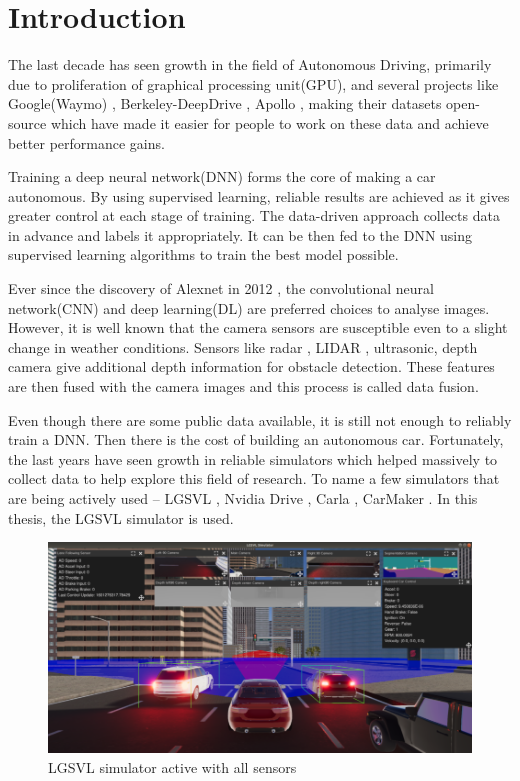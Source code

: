 \chapter{Introduction}

The last decade has seen growth in the field of Autonomous
Driving, primarily due to proliferation of graphical processing unit(GPU), and several projects like Google(Waymo) \cite{Waymo},
Berkeley-DeepDrive \cite{Berkeley-DeepDrive}, Apollo \cite{Apollo}, making their datasets
open-source which have made it easier for people to work on these data and achieve better performance gains.

Training a deep neural network(DNN) forms the core of making a car autonomous.
By using supervised learning, reliable results are achieved as it gives greater control
at each stage of training. The data-driven approach collects data in advance and labels it
appropriately. It can be then fed to the DNN using supervised
learning algorithms to train the best model possible.

Ever since the discovery of Alexnet in 2012 \cite{Alexnet2012}, the convolutional neural network(CNN) and
deep learning(DL) are preferred choices to analyse images.  However, it is well known that the camera sensors are susceptible even to a slight change in weather conditions.
Sensors like radar \cite{Radar}, LIDAR \cite{LIDAR}, ultrasonic\cite{ultrasonic}, depth camera
give additional depth information for obstacle detection. These features are then fused
with the camera images and this process is called data fusion.

Even though there are some public data available, it is still not enough to reliably
train a DNN. Then there is  the cost of building an autonomous car. Fortunately, the last
years have seen growth in reliable simulators which
helped massively to collect data to help explore this field of research.
To name a few simulators that are being actively used -- LGSVL \cite{rong2020lgsvl}, Nvidia Drive
\cite{NvidiaSimulator}, Carla \cite{CarlaSimulator}, CarMaker \cite{CarMaker}.
In this thesis, the LGSVL simulator is used.

\begin{figure}[!ht]
    \begin{center}
        \includegraphics[width=\textwidth]{figures/png/intro/scrot_lgsvl_2.png}
    \end{center}
    \caption{LGSVL\cite{rong2020lgsvl} simulator active with all sensors}
        \label{fig:LGSVL_constellation_sensors}
\end{figure}

